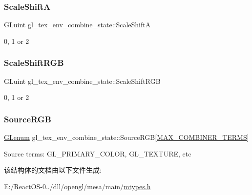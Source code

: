 \subsubsection{\texorpdfstring{Scale\+ShiftA}{ScaleShiftA}}
{\footnotesize\ttfamily G\+Luint gl\+\_\+tex\+\_\+env\+\_\+combine\+\_\+state\+::\+Scale\+ShiftA}

0, 1 or 2 \mbox{\label{structgl__tex__env__combine__state_acf072780f5d4892424c515d296ef02c2}} 
\subsubsection{\texorpdfstring{Scale\+Shift\+R\+GB}{ScaleShiftRGB}}
{\footnotesize\ttfamily G\+Luint gl\+\_\+tex\+\_\+env\+\_\+combine\+\_\+state\+::\+Scale\+Shift\+R\+GB}

0, 1 or 2 \mbox{\label{structgl__tex__env__combine__state_ad1c4026a3ed18308c3a6a986266c449d}} 
\subsubsection{\texorpdfstring{Source\+R\+GB}{SourceRGB}}
{\footnotesize\ttfamily \hyperlink{interfacevoid}{G\+Lenum} gl\+\_\+tex\+\_\+env\+\_\+combine\+\_\+state\+::\+Source\+R\+GB\mbox{[}\hyperlink{mtypes_8h_a575de92c2304b48ceea5fd8f6f2d3fa7}{M\+A\+X\+\_\+\+C\+O\+M\+B\+I\+N\+E\+R\+\_\+\+T\+E\+R\+MS}\mbox{]}}

Source terms\+: G\+L\+\_\+\+P\+R\+I\+M\+A\+R\+Y\+\_\+\+C\+O\+L\+OR, G\+L\+\_\+\+T\+E\+X\+T\+U\+RE, etc 

该结构体的文档由以下文件生成\+:\begin{DoxyCompactItemize}
\item 
E\+:/\+React\+O\+S-\/0../dll/opengl/mesa/main/\hyperlink{mtypes_8h}{mtypes.\+h}\end{DoxyCompactItemize}
